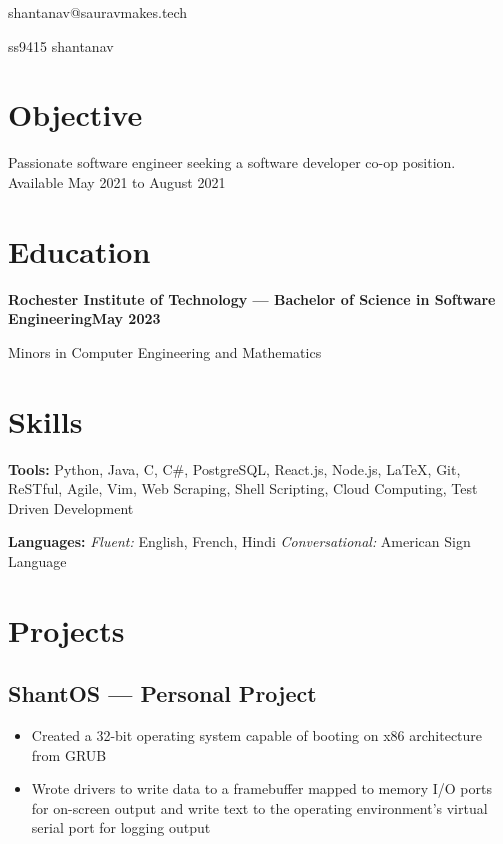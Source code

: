 \documentclass[11pt, letterpaper]{article}
\makeatletter
\renewcommand{\maketitle} {
    \thispagestyle{empty}
    \begin{center}    
        {\huge\bfseries \theauthor}

        {\large shantanav@sauravmakes.tech}

        \faGithub \hspace{4px} {\large ss9415} \hspace{10px} \faLinkedin \hspace{4px} {\large shantanav}

    \end{center}
}
\makeatother
\begin{document}
    \author{John Doe}
    \maketitle

    \section{Objective}
        Passionate software engineer seeking a software developer co-op position. Available
        May 2021 to August 2021
    \section{Education}
        \textbf{Rochester Institute of Technology --- 
        Bachelor of Science in Software Engineering\hfill May 2023} 
        
        \hspace{204px} Minors in Computer Engineering and Mathematics

    \section{Skills}
        \textbf{Tools:}
            Python, Java, C, C\#, PostgreSQL, React.js, Node.js, LaTeX, Git, ReSTful, Agile, Vim,
            Web Scraping, Shell Scripting, Cloud Computing, Test Driven Development

        \textbf{Languages:} \hspace{0px}
            \emph{Fluent:} English, French, Hindi \hspace{4px}
            \emph{Conversational:} American Sign Language

    \section{Projects}
        \subsection{ShantOS --- Personal Project}
            \begin{itemize}[nosep]
                \item Created a 32-bit operating system capable of booting on x86 architecture from GRUB 
                \item Wrote drivers to write data to a framebuffer mapped to memory I/O ports for 
                    on-screen output and write text to the operating environment's virtual serial 
                    port for logging output 
            \end{itemize}
\end{document}
